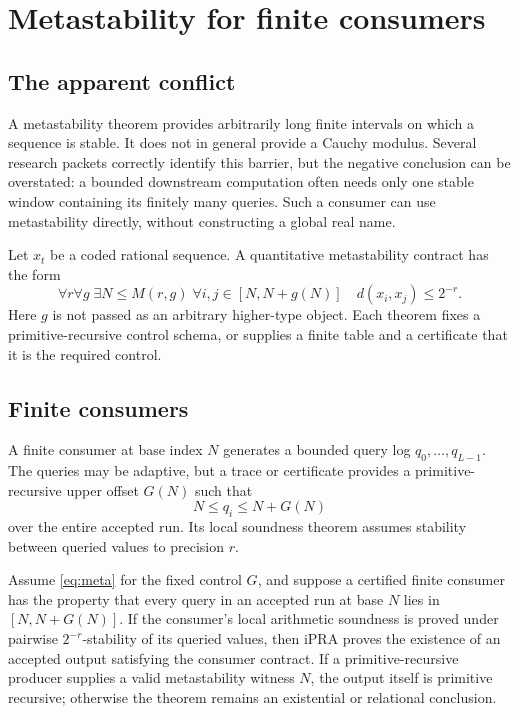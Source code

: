 \section{Metastability for finite consumers}
\label{sec:metastability}

\subsection{The apparent conflict}

A metastability theorem provides arbitrarily long finite intervals on which a
sequence is stable.  It does not in general provide a Cauchy modulus.  Several
research packets correctly identify this barrier, but the negative conclusion
can be overstated: a bounded downstream computation often needs only one
stable window containing its finitely many queries.  Such a consumer can use
metastability directly, without constructing a global real name.

Let \(x_t\) be a coded rational sequence.  A quantitative metastability
contract has the form
\begin{equation}
 \forall r\forall g\;\exists N\le M(r,g)\;
 \forall i,j\in[N,N+g(N)]\quad d(x_i,x_j)\le2^{-r}.
 \label{eq:meta}
\end{equation}
Here \(g\) is not passed as an arbitrary higher-type object.  Each theorem
fixes a primitive-recursive control schema, or supplies a finite table and a
certificate that it is the required control.

\subsection{Finite consumers}

A finite consumer at base index \(N\) generates a bounded query log
\(q_0,\ldots,q_{L-1}\).  The queries may be adaptive, but a trace or certificate
provides a primitive-recursive upper offset \(G(N)\) such that
\[
 N\le q_i\le N+G(N)
\]
over the entire accepted run.  Its local soundness theorem assumes stability
between queried values to precision \(r\).

\begin{theorem}
\label{thm:finite-consumer}
Assume \eqref{eq:meta} for the fixed control \(G\), and suppose a certified
finite consumer has the property that every query in an accepted run at base
\(N\) lies in \([N,N+G(N)]\).  If the consumer's local arithmetic soundness is
proved under pairwise \(2^{-r}\)-stability of its queried values, then iPRA
proves the existence of an accepted output satisfying the consumer contract.
If a primitive-recursive producer supplies a valid metastability witness
\(N\), the output itself is primitive recursive; otherwise the theorem remains
an existential or relational conclusion.
\end{theorem}

